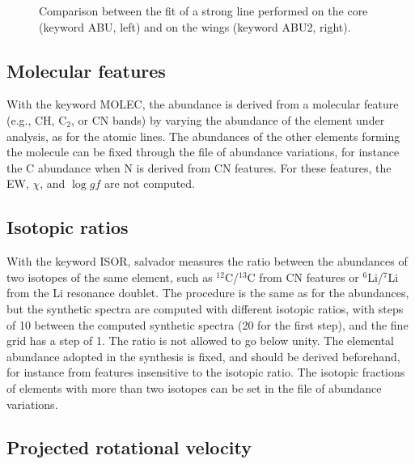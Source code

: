 \documentclass{aa}
\newcommand{\todo}[1]{\textcolor{red}{[#1]}}
\newcommand{\salvador}{salvador}   %
\begin{document}
\begin{figure}
\centering
\fbox{\parbox[c][4cm][c]{0.9\hsize}{\centering
\todo{Fig. 3: the same strong line fitted with ABU (core) and ABU2
(wings), as in Fig. 8 of the manual}}}
\caption{Comparison between the fit of a strong line performed on
the core (keyword ABU, left) and on the wings (keyword ABU2, right).}
\label{fig:abu2}
\end{figure}

\subsection{Molecular features}
\label{sec:molec}

With the keyword MOLEC, the abundance is derived from a molecular
feature (e.g., CH, C$_2$, or CN bands) by varying the abundance of
the element under analysis, as for the atomic lines. The abundances of
the other elements forming the molecule can be fixed through the file
of abundance variations, for instance the C abundance when N is derived
from CN features. For these features, the EW, $\chi$, and $\log gf$ are
not computed.

\subsection{Isotopic ratios}
\label{sec:isor}

With the keyword ISOR, \salvador{} measures the ratio between the
abundances of two isotopes of the same element, such as
$^{12}$C/$^{13}$C from CN features or $^{6}$Li/$^{7}$Li from the Li
resonance doublet. The procedure is the same as for the abundances, but
the synthetic spectra are computed with different isotopic ratios,
with steps of 10 between the computed synthetic spectra (20 for the
first step), and the fine grid has a step of 1. The ratio is not allowed to go below unity. The
elemental abundance adopted in the synthesis is fixed, and should be
derived beforehand, for instance from features insensitive to the
isotopic ratio. The isotopic fractions of elements with more than two
isotopes can be set in the file of abundance variations.

\subsection{Projected rotational velocity}
\label{sec:rotat}
\end{document}
